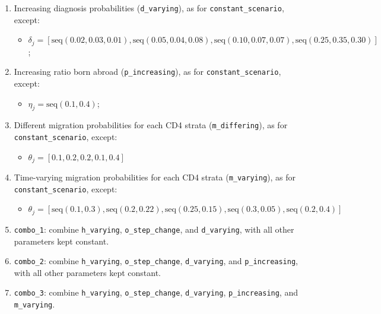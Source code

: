 \documentclass[11pt, a4paper]{article}
\begin{document}
\begin{enumerate}
  \item Increasing diagnosis probabilities (\texttt{d\_varying}), as for \texttt{constant\_scenario}, except:
  \begin{itemize}
      \item $\delta_{j} = \left[\text{seq}(0.02,0.03, 0.01), \text{seq}(0.05,0.04, 0.08), \text{seq}(0.10,0.07, 0.07), \text{seq}(0.25,0.35, 0.30)\right]$;
  \end{itemize}

  \item Increasing ratio born abroad (\texttt{p\_increasing}), as for \texttt{constant\_scenario}, except:
  \begin{itemize}
      \item $\eta_j = \text{seq}(0.1, 0.4)$;
  \end{itemize}

  \item Different migration probabilities for each CD4 strata (\texttt{m\_differing}), as for \texttt{constant\_scenario}, except:
  \begin{itemize}
      \item $\theta_{j} = \left[0.1, 0.2, 0.2, 0.1, 0.4\right]$
  \end{itemize}

  \item Time-varying migration probabilities for each CD4 strata (\texttt{m\_varying}), as for \texttt{constant\_scenario}, except:
  \begin{itemize}
      \item $\theta_{j} = \left[\text{seq}(0.1,0.3), \text{seq}(0.2,0.22), \text{seq}(0.25,0.15), \text{seq}(0.3,0.05), \text{seq}(0.2, 0.4)\right]$
  \end{itemize}

  \item \texttt{combo\_1}: combine \texttt{h\_varying}, \texttt{o\_step\_change}, and \texttt{d\_varying}, with all other parameters kept constant.

  \item \texttt{combo\_2}: combine \texttt{h\_varying}, \texttt{o\_step\_change}, \texttt{d\_varying}, and \texttt{p\_increasing}, with all other parameters kept constant.

  \item \texttt{combo\_3}: combine \texttt{h\_varying}, \texttt{o\_step\_change}, \texttt{d\_varying}, \texttt{p\_increasing}, and \texttt{m\_varying}.

\end{enumerate}
\end{document}
